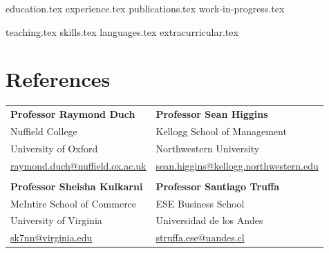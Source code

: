 \documentclass[letterpaper,11pt]{article}
\begin{document}


{education.tex}
{experience.tex}
{publications.tex}
{work-in-progress.tex}

{teaching.tex}
\sidebyside
    {{skills.tex}}
    {{languages.tex}}
{extracurricular.tex}

\newpage

\section*{References}

\begin{tabular}{@{}p{} p{}@{}}
\textbf{Professor Raymond Duch} & \textbf{Professor Sean Higgins} \\
Nuffield College & Kellogg School of Management \\
University of Oxford & Northwestern University \\
\href{mailto:raymond.duch@nuffield.ox.ac.uk}{raymond.duch@nuffield.ox.ac.uk} & \href{mailto:sean.higgins@kellogg.northwestern.edu}{sean.higgins@kellogg.northwestern.edu} \\
\\
\textbf{Professor Sheisha Kulkarni} & \textbf{Professor Santiago Truffa} \\
McIntire School of Commerce & ESE Business School \\
University of Virginia & Universidad de los Andes \\
\href{mailto:sk7nn@virginia.edu}{sk7nn@virginia.edu} & \href{mailto:struffa.ese@uandes.cl}{struffa.ese@uandes.cl} \\
\end{tabular}
\end{document}
